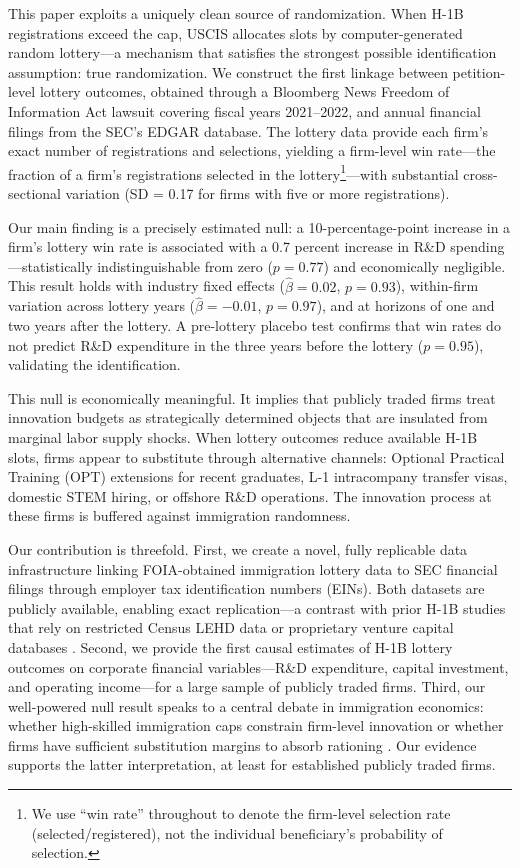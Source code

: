 \documentclass[12pt]{article}
\begin{document}
This paper exploits a uniquely clean source of randomization. When H-1B registrations exceed the cap, USCIS allocates slots by computer-generated random lottery---a mechanism that satisfies the strongest possible identification assumption: true randomization. We construct the first linkage between petition-level lottery outcomes, obtained through a Bloomberg News Freedom of Information Act lawsuit covering fiscal years 2021--2022, and annual financial filings from the SEC's EDGAR database. The lottery data provide each firm's exact number of registrations and selections, yielding a firm-level win rate---the fraction of a firm's registrations selected in the lottery\footnote{We use ``win rate'' throughout to denote the firm-level selection rate (selected/registered), not the individual beneficiary's probability of selection.}---with substantial cross-sectional variation (SD = 0.17 for firms with five or more registrations).

Our main finding is a precisely estimated null: a 10-percentage-point increase in a firm's lottery win rate is associated with a 0.7 percent increase in R\&D spending---statistically indistinguishable from zero ($p = 0.77$) and economically negligible. This result holds with industry fixed effects ($\hat{\beta} = 0.02$, $p = 0.93$), within-firm variation across lottery years ($\hat{\beta} = -0.01$, $p = 0.97$), and at horizons of one and two years after the lottery. A pre-lottery placebo test confirms that win rates do not predict R\&D expenditure in the three years before the lottery ($p = 0.95$), validating the identification.

This null is economically meaningful. It implies that publicly traded firms treat innovation budgets as strategically determined objects that are insulated from marginal labor supply shocks. When lottery outcomes reduce available H-1B slots, firms appear to substitute through alternative channels: Optional Practical Training (OPT) extensions for recent graduates, L-1 intracompany transfer visas, domestic STEM hiring, or offshore R\&D operations. The innovation process at these firms is buffered against immigration randomness.

Our contribution is threefold. First, we create a novel, fully replicable data infrastructure linking FOIA-obtained immigration lottery data to SEC financial filings through employer tax identification numbers (EINs). Both datasets are publicly available, enabling exact replication---a contrast with prior H-1B studies that rely on restricted Census LEHD data \citep{doran2022} or proprietary venture capital databases \citep{dimmock2022}. Second, we provide the first causal estimates of H-1B lottery outcomes on corporate financial variables---R\&D expenditure, capital investment, and operating income---for a large sample of publicly traded firms. Third, our well-powered null result speaks to a central debate in immigration economics: whether high-skilled immigration caps constrain firm-level innovation or whether firms have sufficient substitution margins to absorb rationing \citep{bound2017, kerr2020}. Our evidence supports the latter interpretation, at least for established publicly traded firms.
\end{document}
